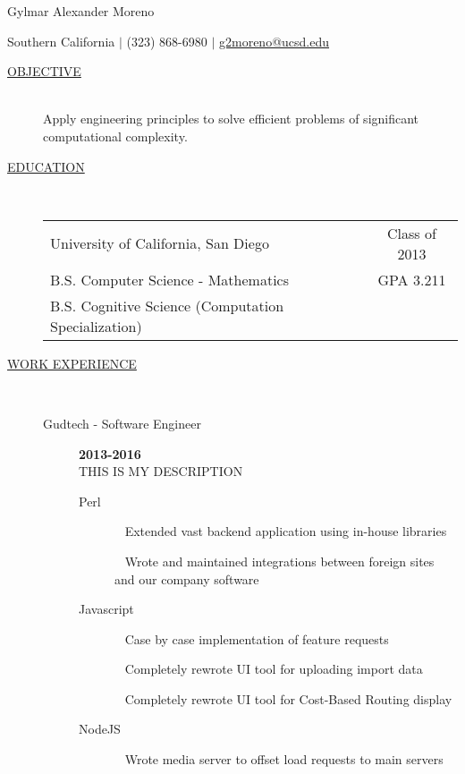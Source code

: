 \documentclass{article}
\begin{document}
\center
{
	\LARGE{Gylmar Alexander Moreno}
}


	Southern California $\mid$ (323) 868-6980 $\mid$
\href{mailto:g2moreno@ucsd.edu}{g2moreno@ucsd.edu}
\begin{description}
    \item[\underline{OBJECTIVE}] \hfill \\
        Apply engineering principles to solve efficient problems 
        of significant computational complexity.

    \item[\underline{EDUCATION}]  \hfill \\
        \begin{tabular}{l|c}
            \large{University of California, San Diego}& \hfill \large{Class of 2013}\\
                            B.S. Computer Science - Mathematics & \hfill \large{GPA 3.211}\\
			B.S. Cognitive Science (Computation Specialization)&\\
		\end{tabular}

    \item[\underline{WORK EXPERIENCE}] \hfill \\
		\begin{description}
            \item[Gudtech - Software Engineer] \hfill \textbf{2013-2016}\\
                THIS IS MY DESCRIPTION

		        \begin{description}

                    \item[Perl] 
                        \textbullet ~ Extended vast backend application using in-house libraries

                        \textbullet ~ Wrote and maintained integrations between foreign sites and our company software

                    \item[Javascript] 
                        \textbullet ~ Case by case implementation of feature requests

                        \textbullet ~ Completely rewrote UI tool for uploading import data

                        \textbullet ~ Completely rewrote UI tool for Cost-Based Routing display

                    \item[NodeJS] 
                        \textbullet ~ Wrote media server to offset load requests to main servers


\end{description}
\end{description}
\end{description}
\end{document}
